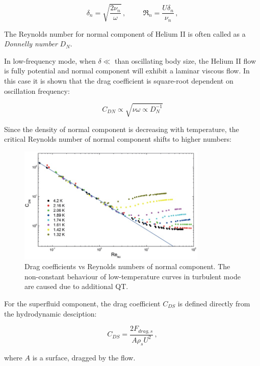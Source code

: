 \begin{equation}
\delta_n = \sqrt{\frac{2\nu_n}{\omega}}\,,
\hspace{1cm}
\Re_n = \frac{U \delta_n}{\nu_n}
\label{twofluid}\,,
\end{equation}

The Reynolds number for normal component of Helium II is often called as a \textit{Donnelly number} $D_N$.

In low-frequency mode, when $\delta \ll$ than oscillating body size, the Helium II flow is fully potential and normal component will exhibit a laminar viscous flow. In this case it is shown that the drag coefficient is square-root dependent on oscillation frequency:

\begin{equation}
C_{DN} \propto \sqrt{\nu \omega \propto D_N^{-1}}
\end{equation}

Since the density of normal component is decreasing with temperature, the critical Reynolds number of normal component shifts to higher numbers:

\begin{figure}[h]
	\centering
	\includegraphics[width=0.8\textwidth]{graphics/theory/C-Re_normal}
	\caption{Drag coefficients vs Reynolds numbers of normal component. The non-constant behaviour of low-temperature curves in turbulent mode are caused due to additional QT.}
	\label{C-Re_normal}
\end{figure}

For the superfluid component, the drag coefficient $C_{DS}$ is defined directly from the hydrodynamic desciption:

\begin{equation}
C_{DS} = \frac{2F_{drag,s}}{A\rho_s U^2}\,,
\end{equation}

where $A$ is a surface, dragged by the flow.

